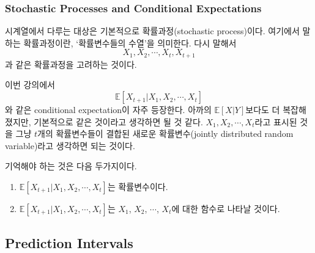 \documentclass{article}
\begin{document}
%
\subsubsection{Stochastic Processes and Conditional Expectations}
시계열에서 다루는 대상은 기본적으로 확률과정(stochastic process)이다.
여기에서 말하는 확률과정이란, `확률변수들의 수열'을 의미한다.
다시 말해서
\[X_1,X_2,\cdots,X_t,X_{t+1}\]
과 같은 확률과정을 고려하는 것이다.

이번 강의에서
\[\mathbb E[X_{t+1}|X_1,X_2,\cdots,X_t]\]
와 같은 conditional expectation이 자주 등장한다.
아까의 \(\mathbb E[X|Y]\)보다도 더 복잡해졌지만, 기본적으로 같은 것이라고 생각하면 될 것 같다.
\(X_1,X_2,\cdots,X_t\)라고 표시된 것을 그냥 \(t\)개의 확률변수들이 결합된 새로운 확률변수(jointly distributed random variable)라고 생각하면 되는 것이다.

기억해야 하는 것은 다음 두가지이다.
\begin{enumerate}[label=(\arabic*)]
\item
\(\mathbb E[X_{t+1}|X_1,X_2,\cdots,X_t]\)는 확률변수이다.
\item
\(\mathbb E[X_{t+1}|X_1,X_2,\cdots,X_t]\)는 \(X_1\), \(X_2\), \(\cdots\), \(X_t\)에 대한 함수로 나타날 것이다.
\end{enumerate}

%
\subsection{Prediction Intervals}
\end{document}

